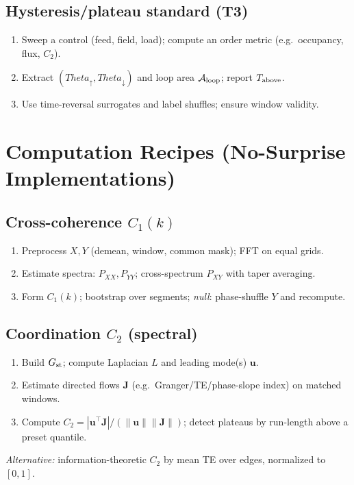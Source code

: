 \documentclass[12pt,a4paper,oneside]{scrreprt}
\def\Theta{Theta}%
\begin{document}
\section*{Hysteresis/plateau standard (T3)}
\begin{enumerate}
\item Sweep a control (feed, field, load); compute an order metric (e.g.\ occupancy, flux, $C_2$).
\item Extract $(\Theta_\uparrow,\Theta_\downarrow)$ and loop area $\mathcal A_{\rm loop}$; report $T_{\rm above}$.
\item Use time-reversal surrogates and label shuffles; ensure window validity.
\end{enumerate}

\chapter{Computation Recipes (No-Surprise Implementations)}\label{app:recipes}
\section*{Cross-coherence $C_1(k)$}
\begin{enumerate}
\item Preprocess $X,Y$ (demean, window, common mask); FFT on equal grids.
\item Estimate spectra: $P_{XX},P_{YY}$; cross-spectrum $P_{XY}$ with taper averaging.
\item Form $C_1(k)$; bootstrap over segments; \emph{null}: phase-shuffle $Y$ and recompute.
\end{enumerate}

\section*{Coordination $C_2$ (spectral)}
\begin{enumerate}
\item Build $G_{\rm st}$; compute Laplacian $L$ and leading mode(s) $\mathbf u$.
\item Estimate directed flows $\mathbf J$ (e.g.\ Granger/TE/phase-slope index) on matched windows.
\item Compute $C_2=|\mathbf u^\top\mathbf J|/(\|\mathbf u\|\|\mathbf J\|)$; detect plateaus by run-length above a preset quantile.
\end{enumerate}
\emph{Alternative:} information-theoretic $C_2$ by mean TE over edges, normalized to $[0,1]$.
\end{document}
